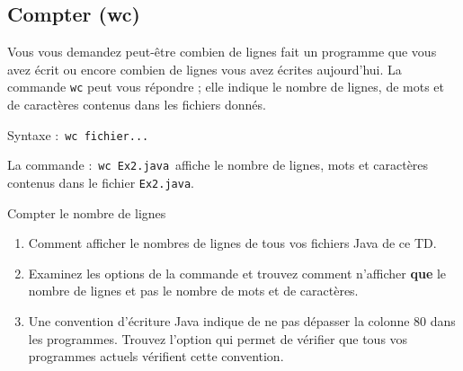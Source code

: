 \documentclass[a4paper,11pt]{article}
\begin{document}
 	\subsection{Compter (wc)}
		Vous vous demandez peut-\^etre combien de lignes fait un programme que vous avez \'ecrit
		ou encore combien de lignes vous avez \'ecrites aujourd'hui.
		La commande \verb_wc_ peut vous r\'epondre ; elle indique le nombre de lignes, de mots et de caract\`eres
		contenus dans les fichiers donn\'es.
		\par
				
		Syntaxe : \,\verb|wc fichier...|\,
            \par
           
        
			
		\begin{Exemple}{}
			La commande : \,\verb|wc Ex2.java|\, affiche le nombre de lignes, mots et caract\`eres contenus dans le fichier
			\verb_Ex2.java_.

		\end{Exemple}	
		
		\begin{Exercice}{Compter le nombre de lignes} 
			\begin{enumerate}
				
				\item Comment afficher le nombres de lignes de tous vos fichiers Java de ce TD.
						
				\item Examinez les options de la commande et trouvez comment n'afficher \textbf{que}
					le nombre de lignes et pas le nombre de mots et de caract\`eres.
						
				\item Une convention d'\'ecriture Java indique de ne pas d\'epasser la colonne 80 dans les programmes.
					Trouvez l'option qui permet de v\'erifier que tous vos programmes actuels v\'erifient cette convention.
			\end{enumerate}
				
			\par\medskip
		
		\end{Exercice}
            \par
		
\end{document}
